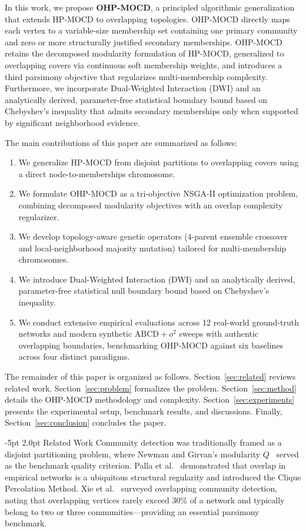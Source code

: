 \documentclass{svproc}
\makeatletter
\renewcommand\section{\@startsection{section}{1}{\z@}%
  {-5pt \@plus -1pt \@minus -0.5pt}%
  {2.0pt \@plus 0.5pt}%
  {\normalfont\large\bfseries\boldmath}}
\makeatother
\begin{document}
In this work, we propose \textbf{OHP-MOCD}, a principled algorithmic generalization that extends HP-MOCD to overlapping topologies. OHP-MOCD directly maps each vertex to a variable-size membership set containing one primary community and zero or more structurally justified secondary memberships. OHP-MOCD retains the decomposed modularity formulation of HP-MOCD, generalized to overlapping covers via continuous soft membership weights, and introduces a third parsimony objective that regularizes multi-membership complexity. Furthermore, we incorporate Dual-Weighted Interaction (DWI) and an analytically derived, parameter-free statistical boundary bound based on Chebyshev's inequality that admits secondary memberships only when supported by significant neighborhood evidence.

The main contributions of this paper are summarized as follows:
\begin{enumerate}
    \item We generalize HP-MOCD from disjoint partitions to overlapping covers using a direct node-to-memberships chromosome.
    \item We formulate OHP-MOCD as a tri-objective NSGA-II optimization problem, combining decomposed modularity objectives with an overlap complexity regularizer.
    \item We develop topology-aware genetic operators (4-parent ensemble crossover and local-neighborhood majority mutation) tailored for multi-membership chromosomes.
    \item We introduce Dual-Weighted Interaction (DWI) and an analytically derived, parameter-free statistical null boundary bound based on Chebyshev's inequality.
    \item We conduct extensive empirical evaluations across 12 real-world ground-truth networks and modern synthetic $\text{ABCD}+o^2$ sweeps with authentic overlapping boundaries, benchmarking OHP-MOCD against six baselines across four distinct paradigms.
\end{enumerate}

The remainder of this paper is organized as follows. Section~\ref{sec:related} reviews related work. Section~\ref{sec:problem} formalizes the problem. Section~\ref{sec:method} details the OHP-MOCD methodology and complexity. Section~\ref{sec:experiments} presents the experimental setup, benchmark results, and discussions. Finally, Section~\ref{sec:conclusion} concludes the paper.

\section{Related Work}\label{sec:related}
Community detection was traditionally framed as a disjoint partitioning problem, where Newman and Girvan's modularity $Q$~\cite{newman2004,newman2006} served as the benchmark quality criterion. Palla et al.~\cite{palla2005} demonstrated that overlap in empirical networks is a ubiquitous structural regularity and introduced the Clique Percolation Method. Xie et al.~\cite{xie2013} surveyed overlapping community detection, noting that overlapping vertices rarely exceed 30\% of a network and typically belong to two or three communities---providing an essential parsimony benchmark.
\end{document}
